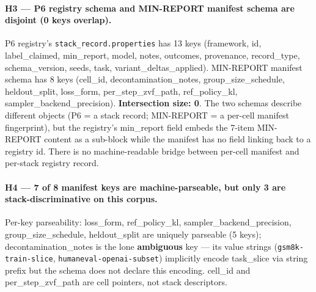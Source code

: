 \paragraph{H3 --- P6 registry schema and MIN-REPORT manifest schema
are disjoint (0 keys overlap).}
P6 registry's \texttt{stack\_record.properties} has 13 keys
(\textsf{framework, id, label\_claimed, min\_report, model, notes,
outcomes, provenance, record\_type, schema\_version, seeds, task,
variant\_deltas\_applied}). MIN-REPORT manifest schema has 8 keys
(\textsf{cell\_id, decontamination\_notes, group\_size\_schedule,
heldout\_split, loss\_form, per\_step\_zvf\_path, ref\_policy\_kl,
sampler\_backend\_precision}). \textbf{Intersection size: 0}. The
two schemas describe different objects (P6 = a stack record;
MIN-REPORT = a per-cell manifest fingerprint), but the registry's
\textsf{min\_report} field embeds the 7-item MIN-REPORT content as
a sub-block while the manifest has no field linking back to a
registry \textsf{id}. There is no machine-readable bridge between
per-cell manifest and per-stack registry record.

\paragraph{H4 --- 7 of 8 manifest keys are machine-parseable, but
only 3 are stack-discriminative on this corpus.}
Per-key parseability: \textsf{loss\_form, ref\_policy\_kl,
sampler\_backend\_precision, group\_size\_schedule, heldout\_split}
are uniquely parseable (5 keys); \textsf{decontamination\_notes} is
the lone \textbf{ambiguous} key --- its value strings
(\texttt{gsm8k-train-slice}, \texttt{humaneval-openai-subset})
implicitly encode \textsf{task\_slice} via string prefix but the
schema does not declare this encoding. \textsf{cell\_id} and
\textsf{per\_step\_zvf\_path} are cell pointers, not stack
descriptors.

